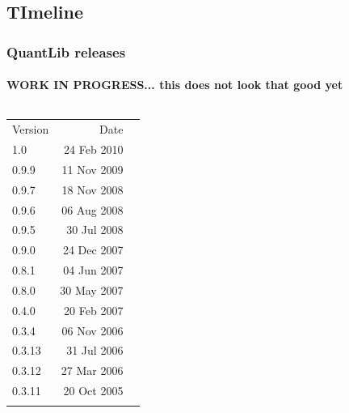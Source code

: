 \documentclass[compress]{beamer}
\begin{document}
\subsection{TImeline}
\begin{frame}
  \frametitle{QuantLib releases}
  \framesubtitle{WORK IN PROGRESS... this does not look that good yet}

  \begin{columns}
    \begin{column}{1.25in}
      \scriptsize
      \begin{tabular}{lrl}
        Version & Date &\\ 
        1.0   & 24 Feb 2010 & \\
        0.9.9 & 11 Nov 2009 & \\
        0.9.7 & 18 Nov 2008 & \\
        0.9.6 & 06 Aug 2008 & \\
        0.9.5 & 30 Jul 2008 & \\
        0.9.0 & 24 Dec 2007 & \\
        0.8.1 & 04 Jun 2007 & \\
        0.8.0 & 30 May 2007 & \\
        0.4.0 & 20 Feb 2007 & \\
        0.3.4 & 06 Nov 2006 & \\
        0.3.13& 31 Jul 2006 & \\
        0.3.12& 27 Mar 2006 & \\
        0.3.11& 20 Oct 2005 & \\
        \phantom{X} & & 
      \end{tabular}
    \end{column}

    \begin{column}{0.25in}
      \phantom{XX}  %
    \end{column}


\end{columns}
\end{frame}
\end{document}
